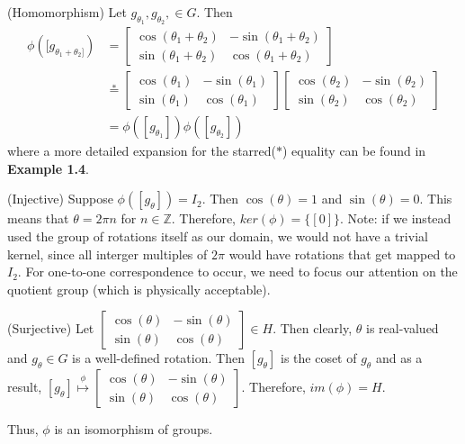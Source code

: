 \documentclass[10pt]{ucthesis}
\newcommand{\Z}{\mathbb{Z}}
\begin{document}
(Homomorphism) Let $g_{\theta_1},g_{\theta_2},\in G$. Then 
\begin{equation}
	\begin{aligned}
		\phi([g_{\theta_1+\theta_2]}) &= \begin{bmatrix}
			\cos(\theta_1+\theta_2) & -\sin(\theta_1+\theta_2) \\
			\sin(\theta_1+\theta_2) & \cos(\theta_1+\theta_2)
		\end{bmatrix} \\
		&\overset{*}{=} \begin{bmatrix}
			\cos(\theta_1) & -\sin(\theta_1) \\
			\sin(\theta_1) & \cos(\theta_1)
		\end{bmatrix}
		\begin{bmatrix}
			\cos(\theta_2) & -\sin(\theta_2) \\
			\sin(\theta_2) & \cos(\theta_2)
		\end{bmatrix}\\
		&= \phi([g_{\theta_1}])\phi([g_{\theta_2}])
	\end{aligned}
\end{equation}
where a more detailed expansion for the starred($*$) equality can be found in \textbf{Example 1.4}.

(Injective) Suppose $\phi([g_\theta]) = I_2$. Then $\cos(\theta) = 1$ and $\sin(\theta) = 0$. This means that $\theta = 2\pi n$ for $n\in\Z$. Therefore, $ker(\phi) = \{[0]\}$. Note: if we instead used the group of rotations itself as our domain, we would not have a trivial kernel, since all interger multiples of $2\pi$ would have rotations that get mapped to $I_2$. For one-to-one correspondence to occur, we need to focus our attention on the quotient group (which is physically acceptable).

(Surjective) Let $\begin{bmatrix}
			\cos(\theta) & -\sin(\theta) \\
			\sin(\theta) & \cos(\theta)
		\end{bmatrix}\in H$. Then clearly, $\theta$ is real-valued and $g_\theta\in G$ is a well-defined rotation. Then $[g_\theta]$ is the coset of $g_\theta$ and as a result, $[g_\theta] \overset{\phi}{\mapsto} \begin{bmatrix}
			\cos(\theta) & -\sin(\theta) \\
			\sin(\theta) & \cos(\theta)
		\end{bmatrix}$. Therefore, $im(\phi) = H$.

Thus, $\phi$ is an isomorphism of groups. \qedsymbol\\
\end{document}
